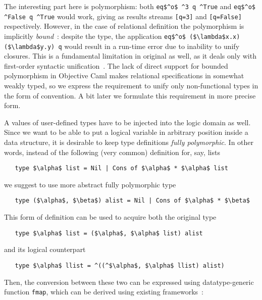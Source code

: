 The interesting part here is polymorphism: both \lstinline|eq$^o$ ^3 q ^True| and \lstinline|eq$^o$ ^False q ^True| would work, 
giving as results streams \lstinline|[q=3]| and \lstinline|[q=False]| respectively. However, in the case of relational definition
the polymorphism is implicitly \emph{bound}~\cite{cardelli}: despite the type, the application \lstinline|eq$^o$ ($\lambda$x.x) ($\lambda$y.y) q|
would result in a run-time error due to inability to unify closures. This is a fundamental limitation in original \miniKanren as well, as it
deals only with first-order syntactic unification~\cite{Unification}. The lack of direct support for bounded polymorphism in Objective Caml
makes relational specifications in \ocanren somewhat weakly typed, so we express the requirement to unify only non-functional types in the form 
of convention. A bit later we formulate this requirement in more precise form.

A values of user-defined types have to be injected into the logic domain as well. Since we want to be 
able to put a logical variable in arbitrary position inside a data structure, it is desirable to keep type definitions
\emph{fully polymorphic}. In other words, instead of the following (very common) definition for, say, lists

\begin{lstlisting}
   type $\alpha$ list = Nil | Cons of $\alpha$ * $\alpha$ list
\end{lstlisting}

\noindent we suggest to use more abstract fully polymorphic type

\begin{lstlisting}
   type ($\alpha$, $\beta$) alist = Nil | Cons of $\alpha$ * $\beta$
\end{lstlisting}

This form of definition can be used to acquire both the original type

\begin{lstlisting}
   type $\alpha$ list = ($\alpha$, $\alpha$ list) alist
\end{lstlisting}

\noindent and its logical counterpart

\begin{lstlisting}
   type $\alpha$ llist = ^((^$\alpha$, $\alpha$ llist) alist)
\end{lstlisting}

Then, the conversion between these two can be expressed using datatype-generic~\cite{DGP} function
\lstinline|fmap|, which can be derived using existing frameworks~\cite{Deriving}:

